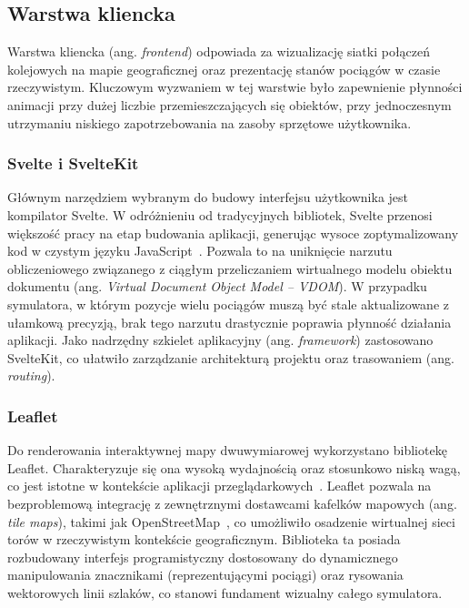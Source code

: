 \documentclass[twoside]{projektInzynierskiMS1z}
\begin{document}
\subsection{Warstwa kliencka}

Warstwa kliencka (ang. \emph{frontend}) odpowiada za wizualizację siatki połączeń
kolejowych na mapie geograficznej oraz prezentację stanów pociągów w czasie
rzeczywistym. Kluczowym wyzwaniem w tej warstwie było zapewnienie płynności animacji
przy dużej liczbie przemieszczających się obiektów, przy jednoczesnym utrzymaniu
niskiego zapotrzebowania na zasoby sprzętowe użytkownika.

\subsubsection{Svelte i SvelteKit}

Głównym narzędziem wybranym do budowy interfejsu użytkownika jest kompilator Svelte.
W odróżnieniu od tradycyjnych bibliotek, Svelte przenosi większość pracy na etap
budowania aplikacji, generując wysoce zoptymalizowany kod w czystym języku
JavaScript~\cite{svelte}. Pozwala to na uniknięcie narzutu obliczeniowego związanego
z ciągłym przeliczaniem wirtualnego modelu obiektu dokumentu (ang. \emph{Virtual
Document Object Model -- VDOM}). W przypadku symulatora, w którym pozycje wielu
pociągów muszą być stale aktualizowane z ułamkową precyzją, brak tego narzutu
drastycznie poprawia płynność działania aplikacji. Jako nadrzędny szkielet
aplikacyjny (ang. \emph{framework}) zastosowano SvelteKit, co ułatwiło zarządzanie
architekturą projektu oraz trasowaniem (ang. \emph{routing}).

\subsubsection{Leaflet}

Do renderowania interaktywnej mapy dwuwymiarowej wykorzystano bibliotekę Leaflet.
Charakteryzuje się ona wysoką wydajnością oraz stosunkowo niską wagą, co jest istotne
w kontekście aplikacji przeglądarkowych~\cite{leaflet}. Leaflet pozwala na
bezproblemową integrację z zewnętrznymi dostawcami kafelków mapowych (ang. \emph{tile
maps}), takimi jak OpenStreetMap~\cite{openstreetmap}, co umożliwiło osadzenie wirtualnej
sieci torów w rzeczywistym kontekście geograficznym. Biblioteka ta posiada rozbudowany
interfejs programistyczny dostosowany do dynamicznego manipulowania znacznikami
(reprezentującymi pociągi) oraz rysowania wektorowych linii szlaków, co stanowi
fundament wizualny całego symulatora.
\end{document}
